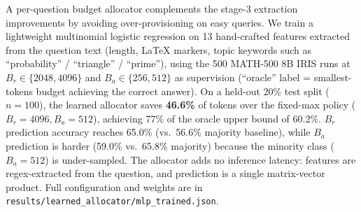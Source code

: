 A per-question budget allocator complements the stage-3 extraction improvements by avoiding over-provisioning on easy queries.
We train a lightweight multinomial logistic regression on 13 hand-crafted features extracted from the question text (length, LaTeX markers, topic keywords such as ``probability'' / ``triangle'' / ``prime''), using the 500 MATH-500 8B IRIS runs at $B_r \in \{2048, 4096\}$ and $B_a \in \{256, 512\}$ as supervision (``oracle'' label = smallest-tokens budget achieving the correct answer).
On a held-out 20\% test split ($n{=}100$), the learned allocator saves \textbf{46.6\%} of tokens over the fixed-max policy ($B_r{=}4096, B_a{=}512$), achieving 77\% of the oracle upper bound of 60.2\%.
$B_r$ prediction accuracy reaches 65.0\% (vs.\ 56.6\% majority baseline), while $B_a$ prediction is harder (59.0\% vs.\ 65.8\% majority) because the minority class ($B_a{=}512$) is under-sampled.
The allocator adds no inference latency: features are regex-extracted from the question, and prediction is a single matrix-vector product.
Full configuration and weights are in \texttt{results/learned\_allocator/mlp\_trained.json}.
